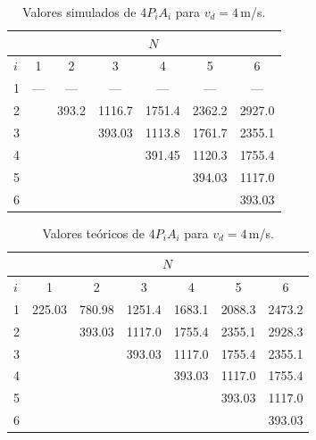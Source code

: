 \begin{table}[h!]
\caption {Valores simulados de $4P_iA_i$ para $v_d=4\,$m/s.}
\label{simulados}
\begin{center}
\begin{tabular}{|l|cccccc|}
\hline
      & \multicolumn{6}{c|}{$N$} \\
\hline
$i$   &  1   &   2    &  3       &  4     &  5     &   6     \\
\hline
 1    &  --- &  ---   &  ---     & ---    & ---    & ---     \\
 2    &      &  393.2 &  1116.7  & 1751.4 & 2362.2 & 2927.0  \\
 3    &      &        &  393.03  & 1113.8 & 1761.7 & 2355.1  \\
 4    &      &        &          & 391.45 & 1120.3 & 1755.4  \\
 5    &      &        &          &        & 394.03 & 1117.0  \\
 6    &      &        &          &        &        & 393.03  \\
\hline
\end{tabular}
\end{center}
\end{table}



\begin{table}[h!]
\caption {Valores teóricos de $4P_iA_i$ para $v_d=4\,$m/s.}
\label{teoricos}
\begin{center}
\begin{tabular}{|l|cccccc|}
\hline
      & \multicolumn{6}{c|}{$N$} \\
\hline
$i$   &  1         &   2        &  3       &  4     &  5     &   6   \\
\hline
 1    &  225.03    &  780.98    &  1251.4  & 1683.1 & 2088.3 & 2473.2 \\
 2    &            &  393.03    &  1117.0  & 1755.4 & 2355.1 & 2928.3 \\
 3    &            &            &  393.03  & 1117.0 & 1755.4 & 2355.1 \\
 4    &            &            &          & 393.03 & 1117.0 & 1755.4 \\
 5    &            &            &          &        & 393.03 & 1117.0 \\
 6    &            &            &          &        &        & 393.03 \\
\hline
\end{tabular}
\end{center}
\end{table}


